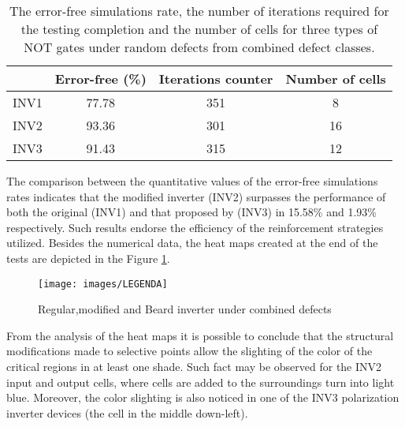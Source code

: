 \begin{table}[H]
\centering
\caption{The error-free simulations rate, the number of iterations required for the testing completion and the number of cells for three types of NOT gates under random defects from combined defect classes.}
\label{table:inverter}
\begin{tabular}{|c|c|c|c|}
\hline
 & Error-free (\%) & Iterations counter & Number of cells \\
\hline
 INV1 & 77.78 & 351 & 8 \\
\hline
 INV2 & 93.36 & 301 & 16 \\
\hline
 INV3 & 91.43 & 315 & 12 \\
\hline
\end{tabular}
\end{table}

The comparison between the quantitative values of the error-free simulations rates indicates that the modified inverter (INV2) surpasses the performance of both the original (INV1) and that proposed by  (INV3) in 15.58\% and 1.93\% respectively. Such results endorse the efficiency of the reinforcement strategies utilized. Besides the numerical data, the heat maps created at the end of the tests are depicted in the Figure \ref{figure:inverter_t1}.

\begin{figure}[H]
\center
{}
\hfill
{}
\linebreak
\hfill
{}
\linebreak
{\texttt{[image: images/LEGENDA]}
}
\caption{Regular,modified and Beard inverter under combined defects}
\label{figure:inverter_t1}
\end{figure}

From the analysis of the heat maps it is possible to conclude that the structural modifications made to selective points allow the slighting of the color of the critical regions in at least one shade. Such fact may be observed for the INV2 input and output cells, where cells are added to the surroundings turn into light blue. Moreover, the color slighting is also noticed in one of the INV3 polarization inverter devices (the cell in the middle down-left).


